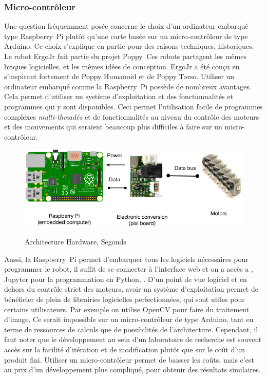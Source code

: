         \subsubsection{Micro-contrôleur}
            Une question fréquemment posée concerne le choix d'un ordinateur embarqué type Raspberry~Pi plutôt qu'une carte basée sur un micro-contrôleur de type Arduino. Ce choix s'explique en partie pour des raisons techniques, historiques.
            Le robot ErgoJr fait partie du projet Poppy. Ces robots partagent les mêmes briques logicielles, et les mêmes idées de conception. ErgoJr a été conçu en s'inspirant fortement de Poppy Humanoid et de Poppy Torso.
            Utiliser un ordinateur embarqué comme la Raspberry~Pi possède de nombreux avantages. Cela permet d'utiliser un système d'exploitation et des fonctionnalités et programmes qui y sont disponibles. Ceci permet l'utilisation facile de programmes complexes \textit{multi-threadés} et de fonctionnalités au niveau du contrôle des moteurs et des mouvements qui seraient beaucoup plus difficiles à faire sur un micro-contrôleur.
            \begin{figure}[!h]
                \centering\label{fig:Hardware}
                \includegraphics[width=0.9\linewidth]{Figures/Segonds-hardware_robot.png}
                \caption{Architecture Hardware, Segonds~\cite{RI}}
            \end{figure}\par%
            Aussi, la Raspberry~Pi permet d'embarquer tous les logiciels nécessaires pour programmer le robot, il suffit de se connecter à l'interface web et on a accès a , Jupyter pour la programmation en Python, \etc. D'un point de vue logiciel et en dehors du contrôle strict des moteurs, avoir un système d'exploitation permet de bénéficier de plein de librairies logicielles perfectionnées, qui sont utiles pour certains utilisateurs. Par exemple on utilise OpenCV pour faire du traitement d'image. Ce serait impossible sur un micro-contrôleur de type Arduino, tant en terme de ressources de calculs que de possibilités de l'architecture.
            Cependant, il faut noter que le développement au sein d'un laboratoire de recherche est souvent accès sur la facilité d'itération et de modification plutôt que sur le coût d'un produit fini. Utiliser un micro-contrôleur permet de baisser les coûts, mais c'est au prix d'un développement plus compliqué, pour obtenir des résultats similaires.
